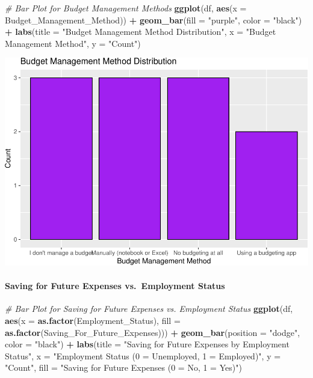 \documentclass[
]{article}
\newenvironment{Shaded}{\begin{snugshade}}{\end{snugshade}}
\newcommand{\AttributeTok}[1]{\textcolor[rgb]{0.13,0.29,0.53}{#1}}
\newcommand{\CommentTok}[1]{\textcolor[rgb]{0.56,0.35,0.01}{\textit{#1}}}
\newcommand{\FunctionTok}[1]{\textcolor[rgb]{0.13,0.29,0.53}{\textbf{#1}}}
\newcommand{\NormalTok}[1]{#1}
\newcommand{\SpecialCharTok}[1]{\textcolor[rgb]{0.81,0.36,0.00}{\textbf{#1}}}
\newcommand{\StringTok}[1]{\textcolor[rgb]{0.31,0.60,0.02}{#1}}
\begin{document}
\begin{Shaded}
\begin{Highlighting}[]
\CommentTok{\# Bar Plot for Budget Management Methods}
\FunctionTok{ggplot}\NormalTok{(df, }\FunctionTok{aes}\NormalTok{(}\AttributeTok{x =}\NormalTok{ Budget\_Management\_Method)) }\SpecialCharTok{+}
  \FunctionTok{geom\_bar}\NormalTok{(}\AttributeTok{fill =} \StringTok{"purple"}\NormalTok{, }\AttributeTok{color =} \StringTok{"black"}\NormalTok{) }\SpecialCharTok{+}
  \FunctionTok{labs}\NormalTok{(}\AttributeTok{title =} \StringTok{"Budget Management Method Distribution"}\NormalTok{, }\AttributeTok{x =} \StringTok{"Budget Management Method"}\NormalTok{, }\AttributeTok{y =} \StringTok{"Count"}\NormalTok{)}
\end{Highlighting}
\end{Shaded}

\includegraphics{Project1_files/figure-latex/unnamed-chunk-10-1.pdf}

\paragraph{Saving for Future Expenses vs.~Employment
Status}\label{saving-for-future-expenses-vs.-employment-status}

\begin{Shaded}
\begin{Highlighting}[]
\CommentTok{\# Bar Plot for Saving for Future Expenses vs. Employment Status}
\FunctionTok{ggplot}\NormalTok{(df, }\FunctionTok{aes}\NormalTok{(}\AttributeTok{x =} \FunctionTok{as.factor}\NormalTok{(Employment\_Status), }\AttributeTok{fill =} \FunctionTok{as.factor}\NormalTok{(Saving\_For\_Future\_Expenses))) }\SpecialCharTok{+}
  \FunctionTok{geom\_bar}\NormalTok{(}\AttributeTok{position =} \StringTok{"dodge"}\NormalTok{, }\AttributeTok{color =} \StringTok{"black"}\NormalTok{) }\SpecialCharTok{+}
  \FunctionTok{labs}\NormalTok{(}\AttributeTok{title =} \StringTok{"Saving for Future Expenses by Employment Status"}\NormalTok{, }\AttributeTok{x =} \StringTok{"Employment Status (0 = Unemployed, 1 = Employed)"}\NormalTok{, }\AttributeTok{y =} \StringTok{"Count"}\NormalTok{, }\AttributeTok{fill =} \StringTok{"Saving for Future Expenses (0 = No, 1 = Yes)"}\NormalTok{)}
\end{Highlighting}
\end{Shaded}
\end{document}
